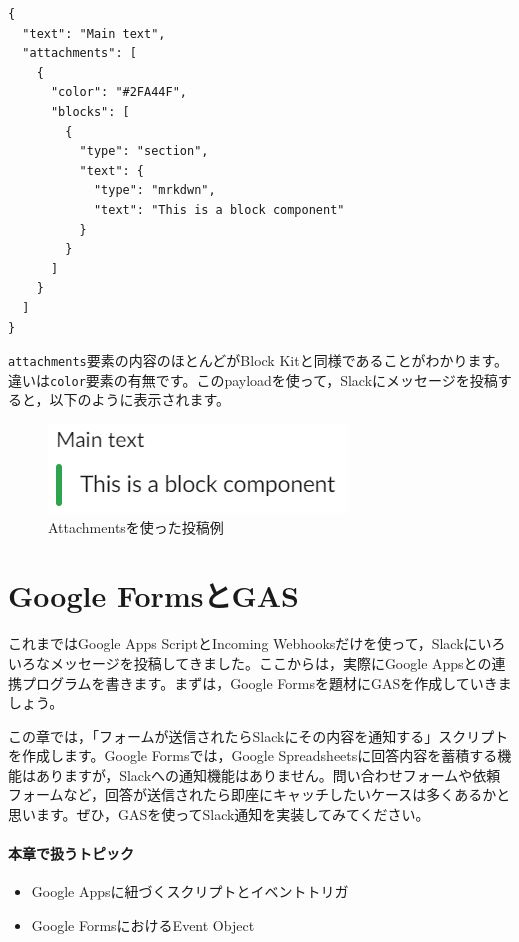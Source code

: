 \documentclass[uplatex,a4j]{jsarticle}
\begin{document}
\begin{lstlisting}[basicstyle=\ttfamily\footnotesize,frame=single,caption=Attachments payload sample]
{
  "text": "Main text",
  "attachments": [
    {
      "color": "#2FA44F",
      "blocks": [
        {
          "type": "section",
          "text": {
            "type": "mrkdwn",
            "text": "This is a block component"
          }
        }
      ]
    }
  ]
}
\end{lstlisting}

\verb|attachments|要素の内容のほとんどがBlock Kitと同様であることがわかります。違いは\verb|color|要素の有無です。このpayloadを使って，Slackにメッセージを投稿すると，以下のように表示されます。

\begin{figure}[H]
 \centering
 \includegraphics[keepaspectratio, scale=0.8]{images/attachments_sample3.png}
 \caption{Attachmentsを使った投稿例}
 \label{fig:attachments_sample3}
\end{figure}

\section{Google FormsとGAS}

これまではGoogle Apps ScriptとIncoming Webhooksだけを使って，Slackにいろいろなメッセージを投稿してきました。ここからは，実際にGoogle Appsとの連携プログラムを書きます。まずは，Google Formsを題材にGASを作成していきましょう。

この章では，「フォームが送信されたらSlackにその内容を通知する」スクリプトを作成します。Google Formsでは，Google Spreadsheetsに回答内容を蓄積する機能はありますが，Slackへの通知機能はありません。問い合わせフォームや依頼フォームなど，回答が送信されたら即座にキャッチしたいケースは多くあるかと思います。ぜひ，GASを使ってSlack通知を実装してみてください。

\paragraph{本章で扱うトピック}
\begin{itemize}
\item Google Appsに紐づくスクリプトとイベントトリガ
\item Google FormsにおけるEvent Object
\end{itemize}
\end{document}
